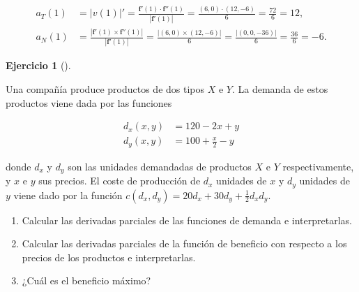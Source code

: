 \documentclass[
  a4paper,
]{scrreport}
\theoremstyle{definition}
\newtheorem{exercise}{Ejercicio}[chapter]
\theoremstyle{remark}
\begin{document}
\begin{tcolorbox}
\begin{enumerate}
  \begin{align*}
  a_T(1) 
  &= |v(1)|'
  = \frac{\mathbf{f}'(1) \cdot \mathbf{f}''(1)}{|\mathbf{f}'(1)|} 
  = \frac{(6, 0) \cdot (12, -6)}{6}
  = \frac{72}{6}
  = 12, \\
  a_N(1)
  &= \frac{|\mathbf{f}'(1) \times \mathbf{f}''(1)|}{|\mathbf{f}'(1)|}
  = \frac{|(6, 0) \times (12, -6)|}{6}
  = \frac{|(0, 0, -36)|}{6}
  = \frac{36}{6}
  = -6.
  \end{align*}
\end{enumerate}

\end{tcolorbox}

\begin{exercise}[]\protect\hypertarget{exr-2}{}\label{exr-2}

Una compañía produce productos de dos tipos \(X\) e \(Y\). La demanda de
estos productos viene dada por las funciones

\begin{align*}
d_x(x,y) &= 120 - 2x + y\\
d_y(x,y) &= 100 + \frac{x}{2} - y
\end{align*}

donde \(d_x\) y \(d_y\) son las unidades demandadas de productos \(X\) e
\(Y\) respectivamente, y \(x\) e \(y\) sus precios. El coste de
producción de \(d_x\) unidades de \(x\) y \(d_y\) unidades de \(y\)
viene dado por la función
\(c(d_x,d_y) = 20 d_x + 30 d_y + \frac{1}{2}d_xd_y\).

\begin{enumerate}
\def\labelenumi{\alph{enumi}.}
\item
  Calcular las derivadas parciales de las funciones de demanda e
  interpretarlas.
\item
  Calcular las derivadas parciales de la función de beneficio con
  respecto a los precios de los productos e interpretarlas.
\item
  ¿Cuál es el beneficio máximo?
\end{enumerate}

\end{exercise}
\end{document}
